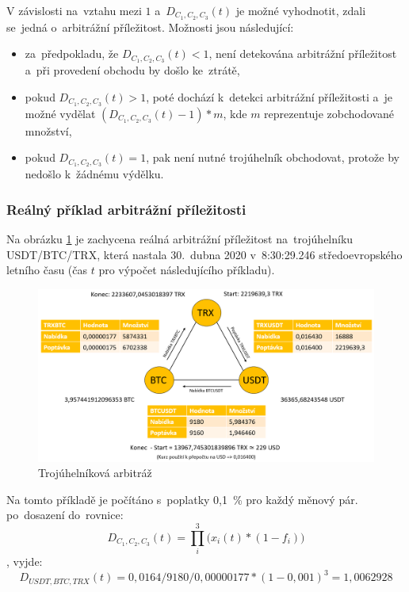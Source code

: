 \documentclass[thesis=B,czech]{FITthesis}[2019/03/21]
\begin{document}
V závislosti na~vztahu mezi \(1\) a~\(D_{C_1,C_2,C_3}(t)\) je možné vyhodnotit, zdali se~jedná o~arbitrážní příležitost. Možnosti jsou následující:
\begin{itemize}
    \item za~předpokladu, že \(D_{C_1,C_2,C_3}(t) < 1\), není detekována arbitrážní  \linebreak příležitost a~při provedení obchodu by došlo ke~ztrátě,
    \item pokud \(D_{C_1,C_2,C_3}(t) > 1\), poté dochází k~detekci arbitrážní příležitosti a~je možné vydělat \( (D_{C_1,C_2,C_3}(t) - 1) * m\), kde \(m\) reprezentuje zobchodované množství,
    \item pokud \(D_{C_1,C_2,C_3}(t) = 1\), pak není nutné trojúhelník obchodovat, protože by nedošlo k~žádnému výdělku.
\end{itemize}

\subsubsection{Reálný příklad arbitrážní příležitosti}
Na obrázku \ref{triangle_arbitrage} je zachycena reálná arbitrážní příležitost na~trojúhelníku USDT/BTC/TRX, která nastala 30.~dubna 2020 v~8:30:29.246  \linebreak středoevropského letního času (čas \(t\) pro výpočet následujícího příkladu). 

\begin{figure}\centering
	\includegraphics[width=1\textwidth]{images/triangle.png}
	\caption{Trojúhelníková arbitráž}\label{triangle_arbitrage}
\end{figure}

Na tomto příkladě je počítáno s~poplatky 0,1~\% pro každý měnový pár. po~dosazení do~rovnice:
\[D_{C_1,C_2,C_3}(t) = \prod_i^3\Big(x_i(t)*(1-f_i)\Big)\]
, vyjde:
\[D_{USDT,BTC,TRX}(t) = 0,0164 / 9180 / 0,00000177 * (1 - 0,001)^3 = 1,0062928 \]
\end{document}
